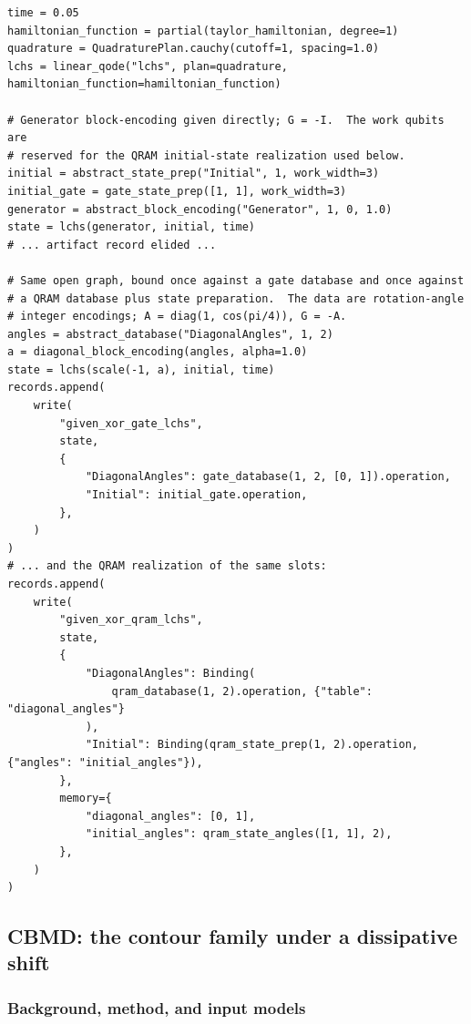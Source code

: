 \begin{lstlisting}[style=pyqpython, caption={LCHS: the protocol takes its quadrature plan and kernel as arguments; one open program is bound to a gate database or to a QRAM database with a runtime table (verbatim from \texttt{examples/ode\_input\_models.py}, inside \texttt{main()}; comments translated, artifact records elided where marked).}, label={lst:lchs}]
time = 0.05
hamiltonian_function = partial(taylor_hamiltonian, degree=1)
quadrature = QuadraturePlan.cauchy(cutoff=1, spacing=1.0)
lchs = linear_qode("lchs", plan=quadrature, hamiltonian_function=hamiltonian_function)

# Generator block-encoding given directly; G = -I.  The work qubits are
# reserved for the QRAM initial-state realization used below.
initial = abstract_state_prep("Initial", 1, work_width=3)
initial_gate = gate_state_prep([1, 1], work_width=3)
generator = abstract_block_encoding("Generator", 1, 0, 1.0)
state = lchs(generator, initial, time)
# ... artifact record elided ...

# Same open graph, bound once against a gate database and once against
# a QRAM database plus state preparation.  The data are rotation-angle
# integer encodings; A = diag(1, cos(pi/4)), G = -A.
angles = abstract_database("DiagonalAngles", 1, 2)
a = diagonal_block_encoding(angles, alpha=1.0)
state = lchs(scale(-1, a), initial, time)
records.append(
    write(
        "given_xor_gate_lchs",
        state,
        {
            "DiagonalAngles": gate_database(1, 2, [0, 1]).operation,
            "Initial": initial_gate.operation,
        },
    )
)
# ... and the QRAM realization of the same slots:
records.append(
    write(
        "given_xor_qram_lchs",
        state,
        {
            "DiagonalAngles": Binding(
                qram_database(1, 2).operation, {"table": "diagonal_angles"}
            ),
            "Initial": Binding(qram_state_prep(1, 2).operation, {"angles": "initial_angles"}),
        },
        memory={
            "diagonal_angles": [0, 1],
            "initial_angles": qram_state_angles([1, 1], 2),
        },
    )
)
\end{lstlisting}

\subsection{CBMD: the contour family under a dissipative shift}
\label{app:cbmd}

\subsubsection{Background, method, and input models}
\label{app:cbmd-method}

